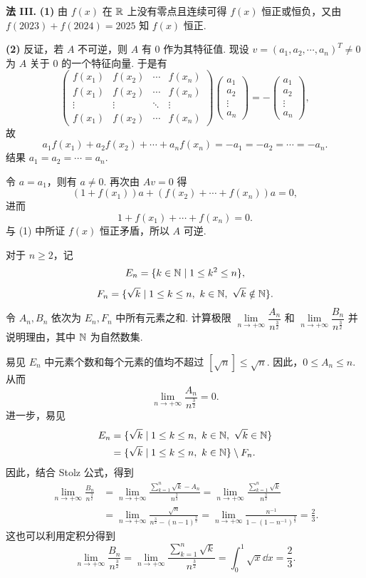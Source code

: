 \begin{solution}
\textbf{法 III.} \textbf{(1)} 由 $f(x)$ 在 $\mathbb{R}$ 上没有零点且连续可得 $f(x)$ 恒正或恒负，又由 $f(2023)+f(2024)=2025$ 知 $f(x)$ 恒正.

\textbf{(2)} 反证，若 $A$ 不可逆，则 $A$ 有 $0$ 作为其特征值. 现设 $v=(a_1,a_2,\cdots,a_n)^T\ne0$ 为 $A$ 关于 $0$ 的一个特征向量. 于是有
\[
  \begin{pmatrix}
    f(x_1) & f(x_2) & \cdots & f(x_n)\\
    f(x_1) & f(x_2) & \cdots & f(x_n)\\
    \vdots & \vdots & \ddots & \vdots\\
    f(x_1) & f(x_2) & \cdots & f(x_n)
  \end{pmatrix}
  \begin{pmatrix}
    a_1\\a_2\\\vdots\\a_n
  \end{pmatrix}
  =-\begin{pmatrix}
    a_1\\a_2\\\vdots\\a_n
  \end{pmatrix},
\]
故
\[
  a_1f(x_1)+a_2f(x_2)+\cdots+a_nf(x_n)=-a_1=-a_2=\cdots=-a_n.
\]
结果 $a_1=a_2=\cdots=a_n$.

令 $a=a_1$，则有 $a\ne0$. 再次由 $Av=0$ 得
\[
  (1+f(x_1))a+(f(x_2)+\cdots+f(x_n))a=0,
\]
进而
\[
  1+f(x_1)+\cdots+f(x_n)=0.
\]
与 (1) 中所证 $f(x)$ 恒正矛盾，所以 $A$ 可逆.
\end{solution}

对于 $n\ge2$，记
\[
  E_n=\{k\in\mathbb{N}\mid 1\le k^2\le n\},
\]
\[
  F_n=\{\sqrt{k}\mid 1\le k\le n,\ k\in\N,\ \sqrt{k}\notin\N\}.
\]
令 $A_n,B_n$ 依次为 $E_n,F_n$ 中所有元素之和. 计算极限 $\lim\limits_{n\to+\infty}\dfrac{A_n}{n^{\frac{3}{2}}}$ 和 $\lim\limits_{n\to+\infty}\dfrac{B_n}{n^{\frac{3}{2}}}$ 并说明理由，其中 $\mathbb{N}$ 为自然数集.
\begin{solution}
易见 $E_n$ 中元素个数和每个元素的值均不超过 $[\sqrt{n}]\le\sqrt{n}$. 因此，$0\le A_n\le n$. 从而
\[
  \lim_{n\to+\infty}\frac{A_n}{n^{\frac{3}{2}}}=0.
\]
进一步，易见
\begin{align*}
E_n&=\{\sqrt{k}\mid 1\le k\le n,\ k\in\mathbb{N},\ \sqrt{k}\in\mathbb{N}\}\\
&=\{\sqrt{k}\mid 1\le k\le n,\ k\in\mathbb{N}\}\setminus F_n.
\end{align*}
因此，结合 Stolz 公式，得到
\begin{align*}
\lim_{n\to+\infty}\frac{B_n}{n^{\frac{3}{2}}}&=\lim_{n\to+\infty}\frac{\sum\limits_{k=1}^{n}\sqrt{k}-A_n}{n^{\frac{3}{2}}}=\lim_{n\to+\infty}\frac{\sum\limits_{k=1}^{n}\sqrt{k}}{n^{\frac{3}{2}}}\\
&=\lim_{n\to+\infty}\frac{\sqrt{n}}{n^{\frac{3}{2}}-(n-1)^{\frac{3}{2}}}=\lim_{n\to+\infty}\frac{n^{-1}}{1-(1-n^{-1})^{\frac{3}{2}}}=\frac{2}{3}.
\end{align*}
这也可以利用定积分得到
\[
  \lim_{n\to+\infty}\frac{B_n}{n^{\frac{3}{2}}}=\lim_{n\to+\infty}\frac{\sum\limits_{k=1}^{n}\sqrt{k}}{n^{\frac{3}{2}}}=\int_0^1\sqrt{x}\dd x=\frac{2}{3}.
\]
\end{solution}

